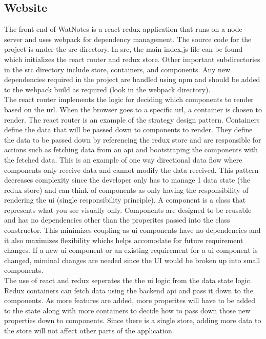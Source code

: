 \documentclass[12pt]{article}
\begin{document}
  \subsection{Website}
  The front-end of WatNotes is a react-redux application that runs on a node server and uses webpack for dependency management. The source code for the project is under the src directory. In src, the main index.js file can be found which initializes the react router and redux store. Other important subdirectories in the src directory include store, containers, and components. Any new dependencies required in the project are handled using npm and should be added to the webpack build as required (look in the webpack directory).\\

  The react router implements the logic for deciding which components to render based on the url. When the browser goes to a specific url, a container is chosen to render. The react router is an example of the strategy design pattern. Containers define the data that will be passed down to components to render. They define the data to be passed down by referencing the redux store and are responsible for actions such as fetching data from an api and bootstraping the components with the fetched data. This is an example of one way directional data flow where components only receive data and cannot modify the data received. This pattern decreases complexity since the developer only has to manage 1 data state (the redux store) and can think of components as only having the responsibility of rendering the ui (single responsibility principle). A component is a class that represents what you see visually only. Components are designed to be reusable and has no dependencies other than the properites passed into the class constructor. This minimizes coupling as ui components have no dependencies and it also maximizes flexibility whichs helps accomodate for future requirement changes. If a new ui component or an existing requirement for a ui component is changed, miminal changes are needed since the UI would be broken up into small components.\\

  The use of react and redux seperates the the ui logic from the data state logic. Redux containers can fetch data using the backend api and pass it down to the components. As more features are added, more properites will have to be added to the state along with more containers to decide how to pass down those new properties down to components. Since there is a single store, adding more data to the store will not affect other parts of the application. 
\end{document}
